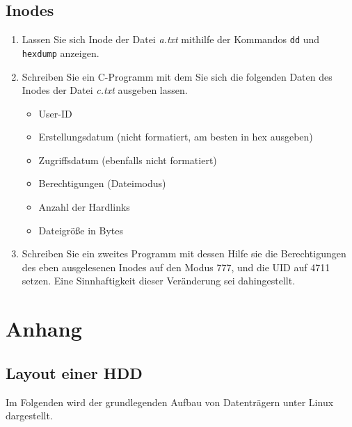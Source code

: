 \documentclass[11pt,a4paper]{article}
\def\inlinebash{\lstinline[style=bash]}
\begin{document}
\subsection{Inodes}
\begin{enumerate}
	\item Lassen Sie sich Inode der Datei \emph{a.txt} mithilfe der Kommandos \inlinebash$dd$
		und \inlinebash$hexdump$ anzeigen.
	\item Schreiben Sie ein C-Programm mit dem Sie sich die folgenden Daten
		des Inodes der Datei \emph{c.txt} ausgeben lassen.
		\begin{itemize}
			\item User-ID
			\item Erstellungsdatum (nicht formatiert, am besten in hex ausgeben)
			\item Zugriffsdatum (ebenfalls nicht formatiert)
			\item Berechtigungen (Dateimodus)
			\item Anzahl der Hardlinks
			\item Dateigröße in Bytes
		\end{itemize}
		
	\item Schreiben Sie ein zweites Programm mit dessen Hilfe sie die 
		Berechtigungen des eben ausgelesenen Inodes auf den Modus 777, 
		und die UID auf 4711 setzen.
		Eine Sinnhaftigkeit dieser Veränderung sei dahingestellt.
\end{enumerate}


\pagebreak{}

\section{Anhang}
\subsection{Layout einer HDD}
Im Folgenden wird der grundlegenden Aufbau von Datenträgern unter Linux dargestellt.
\paragraph{}
\end{document}
